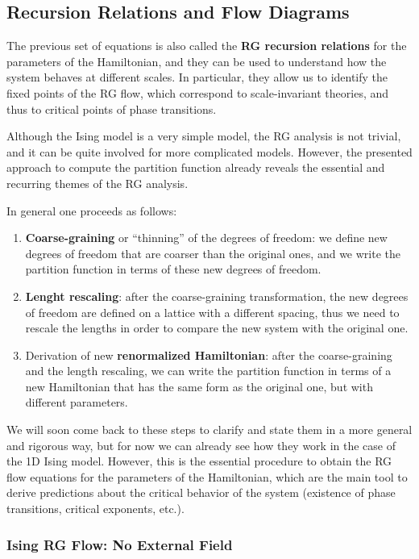 \subsection{Recursion Relations and Flow Diagrams}

The previous set of equations is also called the \textbf{RG recursion relations} for the parameters of the Hamiltonian, and they can be used to understand how the system behaves at different scales. In particular, they allow us to identify the fixed points of the RG flow, which correspond to scale-invariant theories, and thus to critical points of phase transitions.

Although the Ising model is a very simple model, the RG analysis is not trivial, and it can be quite involved for more complicated models. However, the presented approach to compute the partition function already reveals the essential and recurring themes of the RG analysis.

In general one proceeds as follows:
\begin{enumerate}
    \item \textbf{Coarse-graining} or ``thinning'' of the degrees of freedom: we define new degrees of freedom that are coarser than the original ones, and we write the partition function in terms of these new degrees of freedom.
    \item \textbf{Lenght rescaling}: after the coarse-graining transformation, the new degrees of freedom are defined on a lattice with a different spacing, thus we need to rescale the lengths in order to compare the new system with the original one.
    \item Derivation of new \textbf{renormalized Hamiltonian}: after the coarse-graining and the length rescaling, we can write the partition function in terms of a new Hamiltonian that has the same form as the original one, but with different parameters.
\end{enumerate}
We will soon come back to these steps to clarify and state them in a more general and rigorous way, but for now we can already see how they work in the case of the 1D Ising model. However, this is the essential procedure to obtain the RG flow equations for the parameters of the Hamiltonian, which are the main tool to derive predictions about the critical behavior of the system (existence of phase transitions, critical exponents, etc.).

\subsubsection{Ising RG Flow: No External Field}

